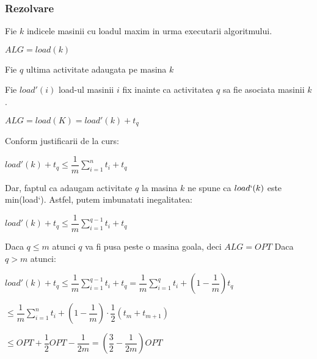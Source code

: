 \documentclass[a4paper]{article}
\begin{document}
\subsubsection*{Rezolvare}
\begin{flushleft}
Fie $k$ indicele masinii cu loadul maxim in urma executarii algoritmului.

$ALG = load(k)$

Fie $q$ ultima activitate adaugata pe masina $k$

Fie $load'(i)$ load-ul masinii $i$ fix inainte ca activitatea $q$ sa fie asociata masinii $k$.

$ALG = load(K) = load'(k) + t_{q}$

Conform justificarii de la curs:
\begin{center}
$load'(k) + t_{q} \leq \dfrac{1}{m} \sum_{i=1}^{n}t_{i} + t_{q}$
\end{center}

Dar, faptul ca adaugam activitate $q$ la masina $k$ ne spune ca $load`(k)$ este min(load`). Astfel, putem imbunatati inegalitatea:

\begin{center}
$load'(k) + t_{q} \leq \dfrac{1}{m} \sum_{i=1}^{q-1}t_{i} + t_{q}$
\end{center} 

Daca $q \leq m$ atunci $q$ va fi pusa peste o masina goala, deci $ALG = OPT$
Daca $q > m$ atunci:
\begin{center}
$load'(k) + t_{q} \leq \dfrac{1}{m} \sum_{i=1}^{q-1}t_{i} + t_{q} = \dfrac{1}{m} \sum_{i=1}^{q}t_{i} + (1-\dfrac{1}{m})t_{q}$ 

$ \leq \dfrac{1}{m} \sum_{i=1}^{n}t_{i} + (1-\dfrac{1}{m}) \cdot \dfrac{1}{2}(t_{m} + t_{m+1})$

$ \leq OPT + \dfrac{1}{2} OPT  - \dfrac{1}{2m}= (\dfrac{3}{2} - \dfrac{1}{2m})OPT$
\end{center}

\end{flushleft}
\end{document}
